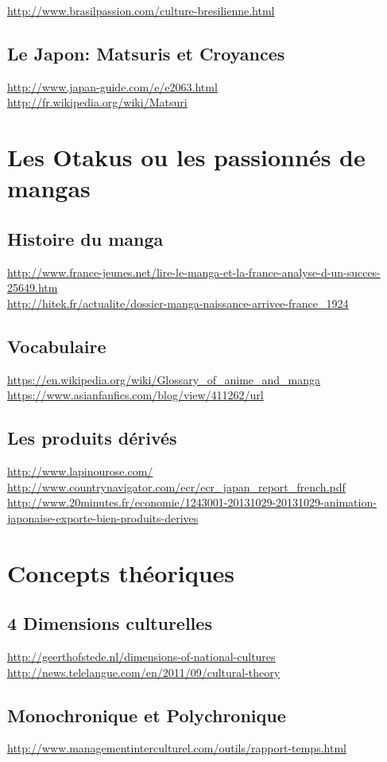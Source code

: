 \noindent
\url{http://www.brasilpassion.com/culture-bresilienne.html}

\subsection{Le Japon: Matsuris et Croyances}

\noindent
\url{http://www.japan-guide.com/e/e2063.html}\\
\url{http://fr.wikipedia.org/wiki/Matsuri}

\section{Les Otakus ou les passionnés de mangas}

\subsection{Histoire du manga}

\noindent
\url{http://www.france-jeunes.net/lire-le-manga-et-la-france-analyse-d-un-succes-25649.htm}\\
\url{http://hitek.fr/actualite/dossier-manga-naissance-arrivee-france_1924}

\subsection{Vocabulaire}

\noindent
\url{https://en.wikipedia.org/wiki/Glossary_of_anime_and_manga}\\
\url{https://www.asianfanfics.com/blog/view/411262/url}

\subsection{Les produits dérivés}

\noindent
\url{http://www.lapinourose.com/}\\
\url{http://www.countrynavigator.com/ecr/ecr_japan_report_french.pdf}\\
\url{http://www.20minutes.fr/economie/1243001-20131029-20131029-animation-japonaise-exporte-bien-produits-derives}

\section{Concepts théoriques}

\subsection{4 Dimensions culturelles}

\noindent
\url{http://geerthofstede.nl/dimensions-of-national-cultures}\\
\url{http://news.telelangue.com/en/2011/09/cultural-theory}

\subsection{Monochronique et Polychronique}

\noindent
\url{http://www.managementinterculturel.com/outils/rapport-temps.html}\\
